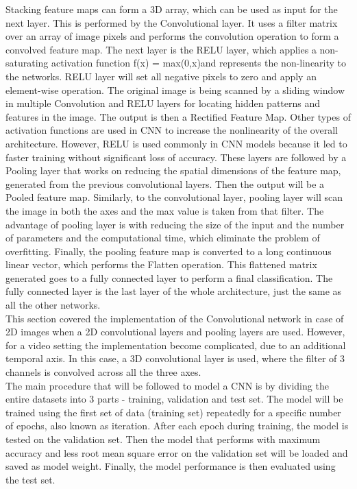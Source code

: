 Stacking feature maps can form a 3D array, which can be used as input for the next layer. This is performed by the Convolutional layer. It uses a filter matrix over an array of image pixels and performs the convolution operation to form a convolved feature map. The next layer is the RELU layer, which applies a non-saturating activation function f(x) = max(0,x)and represents the non-linearity to the networks. RELU layer will set all negative pixels to zero and apply an element-wise operation. The original image is being scanned by a sliding window in multiple Convolution and RELU layers for locating hidden patterns and features in the image. The output is then a Rectified Feature Map. Other types of activation functions are used in CNN to increase the nonlinearity of the overall architecture. However, RELU is used commonly in CNN models because it led to faster training without significant loss of accuracy. These layers are followed by a Pooling layer that works on reducing the spatial dimensions of the feature map, generated from the previous convolutional layers. Then the output will be a Pooled feature map. Similarly, to the convolutional layer, pooling layer will scan the image in both the axes and the max value is taken from that filter. The advantage of pooling layer is with reducing the size of the input and the number of parameters and the computational time, which eliminate the problem of overfitting. Finally, the pooling feature map is converted to a long continuous linear vector, which performs the Flatten operation. This flattened matrix generated goes to a fully connected layer to perform a final classification. The fully connected layer is the last layer of the whole architecture, just the same as all the other networks.\\

This section covered the implementation of the Convolutional network in case of 2D images when a 2D convolutional layers and pooling layers are used. However, for a video setting the implementation become complicated, due to an additional temporal axis. In this case, a 3D convolutional layer is used, where the filter of 3 channels is convolved across all the three axes.\\

The main procedure that will be followed to model a CNN is by dividing the entire datasets into 3 parts - training, validation and test set. The model will be trained using the first set of data (training set) repeatedly for a specific number of epochs, also known as iteration. After each epoch during training, the model is tested on the validation set. Then the model that performs with maximum accuracy and less root mean square error on the validation set will be loaded and saved as model weight. Finally, the model performance is then evaluated using the test set.

